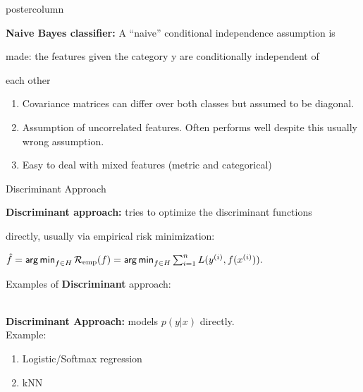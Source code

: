 \documentclass{beamer}
\begin{document}
\begin{frame}[fragile]{}
\begin{columns}
\begin{column}{.31\textwidth}
\begin{beamercolorbox}[center]{postercolumn}
\begin{minipage}{.98\textwidth}
{\begin{myblock}{}
						\begin{codebox}
							 \textbf{Naive Bayes classifier: }A “naive” conditional independence assumption is
						\end{codebox}
						\begin{codebox}
							  made: the features given the category y are conditionally independent of
						\end{codebox}
						\begin{codebox}
							   each other
						\end{codebox}
						\begin{enumerate}
                        \item Covariance matrices can differ over both classes but assumed to be diagonal.
                        \item Assumption of uncorrelated features. Often performs well despite this usually wrong assumption.
                        \item Easy to deal with mixed features (metric and categorical)
                        \end{enumerate}
						\hspace*{1ex}
					\begin{myblock}{Discriminant  Approach}
						\begin{codebox}
							\textbf{Discriminant approach: }tries to optimize the discriminant functions
						\end{codebox}
						\begin{codebox}
						    directly, usually via empirical risk minimization:
						\end{codebox}
						\hspace*{1ex}$ \hat{f} = \mathop{\sf arg\,min}_{f \in H} \mathcal{R}_{\text{emp}}(f) = \mathop{\sf arg\,min}_{f \in H} \sum_{i=1}^n L(y^{(i)}, f(x^{(i)})).$
						\\
						\begin{codebox}
							Examples of \textbf{Discriminant} approach:
						\end{codebox}
						\end{myblock}
						\\
						\hspace*{1ex}\textbf{Discriminant Approach: }models $p(y|x)$ directly. \\\hspace*{1ex}Example: 
						\begin{enumerate}
                        \item Logistic/Softmax regression
                        \item kNN

\end{enumerate}
\end{myblock}}
\end{minipage}
\end{beamercolorbox}
\end{column}
\end{columns}
\end{frame}
\end{document}
